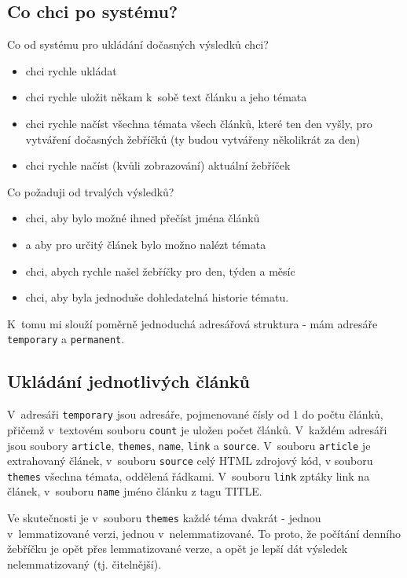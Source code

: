 \documentclass[12pt]{amsart}
\begin{document}
\subsection{Co chci po systému?}
Co od systému pro ukládání dočasných výsledků chci?
\begin{itemize}
    \item chci rychle ukládat 
    \item chci rychle uložit někam k~sobě text článku a jeho témata
    \item chci rychle načíst všechna témata všech článků, které ten den vyšly, pro vytváření dočasných žebříčků (ty budou vytvářeny několikrát za den)
    \item chci rychle načíst (kvůli zobrazování) aktuální žebříček
\end{itemize}

Co požaduji od trvalých výsledků?
\begin{itemize}
    \item chci, aby bylo možné ihned přečíst jména článků
    \item a aby pro určitý článek bylo možno nalézt témata
    \item chci, abych rychle našel žebříčky pro den, týden a měsíc
    \item chci, aby byla jednoduše dohledatelná historie tématu.
\end{itemize}

K~tomu mi slouží poměrně jednoduchá adresářová struktura - mám adresáře \texttt{temporary} a \texttt{permanent}.

\subsection{Ukládání jednotlivých článků}
V~adresáři \texttt{temporary} jsou adresáře, pojmenované čísly od 1 do počtu článků, přičemž v~textovém souboru \texttt{count} je uložen počet článků. V~každém adresáři jsou soubory \texttt{article}, \texttt{themes}, \texttt{name}, \texttt{link} a \texttt{source}. V~souboru \texttt{article} je extrahovaný článek, v~souboru \texttt{source} celý HTML zdrojový kód, v souboru \texttt{themes} všechna témata, oddělená řádkami. V~souboru \texttt{link} zptáky link na článek, v~souboru \texttt{name} jméno článku z tagu TITLE.

Ve skutečnosti je v~souboru \texttt{themes} každé téma dvakrát - jednou v~lemmatizované verzi, jednou v~nelemmatizované. To proto, že počítání denního žebříčku je opět přes lemmatizované verze, a opět je lepší dát výsledek nelemmatizovaný (tj. čitelnější).
\end{document}
